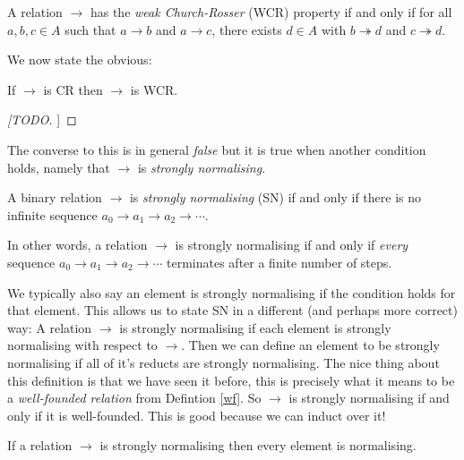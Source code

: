 \begin{defin}
    A relation $\to$ has the \emph{weak Church-Rosser} (WCR) property if and only if for all $a, b, c \in A$ such that $a \to b$ and $a \to c$, there exists $d \in A$ with $b \twoheadrightarrow d$ and $c \twoheadrightarrow d$.
\end{defin}

We now state the obvious:

\begin{cor}\label{cr_is_wcr}
    If $\to$ is CR then $\to$ is WCR.
\end{cor}

\begin{proof}
    [[TODO]]
\end{proof}

The converse to this is in general \emph{false} but it is true when another condition holds, namely that $\to$ is \emph{strongly normalising}.

\begin{defin}
    A binary relation $\to$ is \emph{strongly normalising} (SN) if and only if there is no infinite sequence $a_0 \to a_1 \to a_2 \to  \cdots$.
\end{defin}

\begin{remark}
    In other words, a relation $\to$ is strongly normalising if and only if \emph{every} sequence $a_0 \to a_1 \to a_2 \to  \cdots$ terminates after a finite number of steps.
\end{remark}

\begin{remark}
    We typically also say an element is strongly normalising if the condition holds for that element. This allows us to state SN in a different (and perhaps more correct) way: A relation $\to$ is strongly normalising if each element is strongly normalising with respect to $\to$. Then we can define an element to be strongly normalising if all of it's reducts are strongly normalising. The nice thing about this definition is that we have seen it before, this is precisely what it means to be a \emph{well-founded relation} from Defintion \ref{wf}. So $\to$ is strongly normalising if and only if it is well-founded. This is good because we can induct over it!
\end{remark}

\begin{cor}
    If a relation $\to$ is strongly normalising then every element is normalising.
\end{cor}

